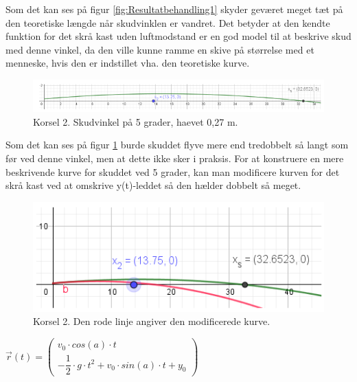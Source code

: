 Som det kan ses på figur \ref{fig:Resultatbehandling1} skyder geværet meget tæt på den teoretiske længde når skudvinklen er vandret. Det betyder at den kendte funktion for det skrå kast uden luftmodstand er en god model til at beskrive skud med denne vinkel, da den ville kunne ramme en skive på størrelse med et menneske, hvis den er indstillet vha. den teoretiske kurve.

\begin{figure}[H]
\centering
\includegraphics[scale=0.7]{Billeder/Resultatbehandling2.png}
\caption{Korsel 2. Skudvinkel på 5 grader, haevet 0,27 m.}
\label{fig:Resultatbehandling2}
\end{figure}

Som det kan ses på figur \ref{fig:Resultatbehandling2} burde skuddet flyve mere end tredobbelt så langt som før ved denne vinkel, men at dette ikke sker i praksis. For at konstruere en mere beskrivende kurve for skuddet ved 5 grader, kan man modificere kurven for det skrå kast ved at omskrive y(t)-leddet så den hælder dobbelt så meget.

\begin{figure}[H]
\centering
\includegraphics[scale=0.7]{Billeder/Resultatbehandling3.png}
\caption{Korsel 2. Den rode linje angiver den modificerede kurve.}
\label{fig:Resultatbehandling3}
\end{figure}

\begin{center}
\begin{math}
\overrightarrow{r}(t) = 
\begin{pmatrix}
v_{0} \cdot cos(a) \cdot t\\
- \dfrac{1}{2} \cdot g \cdot t^{2} + v_{0} \cdot sin(a) \cdot t + y_{0}
\end{pmatrix}
\end{math}
\end{center}


